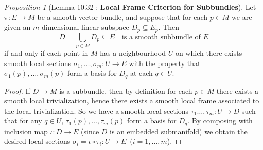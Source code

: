 \documentclass[a4paper]{article}
\theoremstyle{remark}
\newtheorem{prop}{Proposition}
\newcommand{\subhim}{\subseteq} %
\begin{document}
\begin{prop}[Lemma 10.32 : \textbf{Local Frame Criterion for Subbundles}]
Let $\pi : E \to M$ be a smooth vector bundle, and suppose that for each $p \in M$ we are given an $m$-dimensional linear subspace $D_p \subhim E_p$. Then $$D = \bigcup_{p \in M} D_p \subhim E \quad \text{is a smooth subbundle of }E$$ if and only if each point in $M$ has a neighbourhood $U$ on which there exists smooth local sections $\sigma_1,\dots,\sigma_m : U \to E$ with the property that $\sigma_1(p),\dots,\sigma_m(p)$ form a basis for $D_q$ at each $q \in U$.
\end{prop}
\begin{proof}
If $D \to M$ is a subbundle, then by definition for each $p \in M$ there exists a smooth local trivialization, hence there exists a smooth local frame associated to the local trivialization. So we have a smooth local sections $\tau_1 \dots,\tau_m : U \to D$ such that for any $q \in U$, $\tau_1(p),\dots, \tau_m(p)$ form a basis for $D_q$. By composing with inclusion map $\iota : D \to E$ (since $D$ is an embedded submanifold) we obtain the desired local sections $\sigma_i = \iota \circ \tau_i : U \to E$\, ($i = 1,\dots , m$).


\end{proof}
\end{document}
